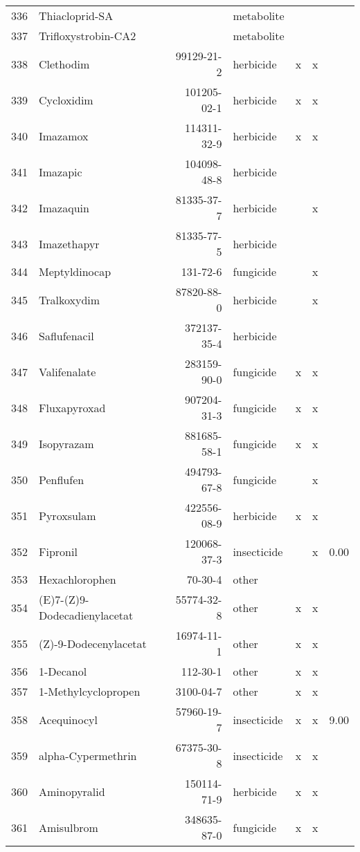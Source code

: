 \begin{longtable}{lp{3cm}rlp{0.5cm}p{0.5cm}p{1cm}}
  336 & Thiacloprid-SA &  & metabolite &  &  &  \\ 
  337 & Trifloxystrobin-CA2 &  & metabolite &  &  &  \\ 
  338 & Clethodim & 99129-21-2 & herbicide & x & x &  \\ 
  339 & Cycloxidim & 101205-02-1 & herbicide & x & x &  \\ 
  340 & Imazamox & 114311-32-9 & herbicide & x & x &  \\ 
  341 & Imazapic & 104098-48-8 & herbicide &  &  &  \\ 
  342 & Imazaquin & 81335-37-7 & herbicide &  & x &  \\ 
  343 & Imazethapyr & 81335-77-5 & herbicide &  &  &  \\ 
  344 & Meptyldinocap & 131-72-6 & fungicide &  & x &  \\ 
  345 & Tralkoxydim & 87820-88-0 & herbicide &  & x &  \\ 
  346 & Saflufenacil & 372137-35-4 & herbicide &  &  &  \\ 
  347 & Valifenalate & 283159-90-0 & fungicide & x & x &  \\ 
  348 & Fluxapyroxad & 907204-31-3 & fungicide & x & x &  \\ 
  349 & Isopyrazam & 881685-58-1 & fungicide & x & x &  \\ 
  350 & Penflufen & 494793-67-8 & fungicide &  & x &  \\ 
  351 & Pyroxsulam & 422556-08-9 & herbicide & x & x &  \\ 
  352 & Fipronil & 120068-37-3 & insecticide &  & x & 0.00 \\ 
  353 & Hexachlorophen & 70-30-4 & other &  &  &  \\ 
  354 & (E)7-(Z)9-Dodecadienylacetat & 55774-32-8 & other & x & x &  \\ 
  355 & (Z)-9-Dodecenylacetat & 16974-11-1 & other & x & x &  \\ 
  356 & 1-Decanol & 112-30-1 & other & x & x &  \\ 
  357 & 1-Methylcyclopropen & 3100-04-7 & other & x & x &  \\ 
  358 & Acequinocyl & 57960-19-7 & insecticide & x & x & 9.00 \\ 
  359 & alpha-Cypermethrin & 67375-30-8 & insecticide & x & x &  \\ 
  360 & Aminopyralid & 150114-71-9 & herbicide & x & x &  \\ 
  361 & Amisulbrom & 348635-87-0 & fungicide & x & x &  \\ 

\end{longtable}
